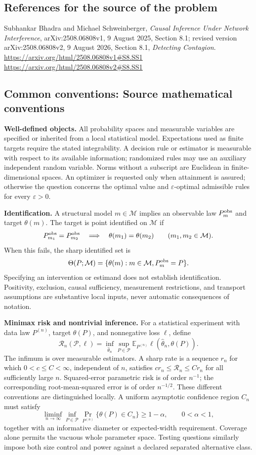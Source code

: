 \documentclass[11pt,a4paper]{article}
\newcommand{\E}{\mathbb E}
\begin{document}
\subsection*{References for the source of the problem}
Subhankar Bhadra and Michael Schweinberger, \emph{Causal Inference Under Network Interference}, arXiv:2508.06808v1, 9 August 2025, Section 8.1; revised version arXiv:2508.06808v2, 9 August 2026, Section 8.1, \emph{Detecting Contagion}.
\url{https://arxiv.org/html/2508.06808v1#S8.SS1}
\url{https://arxiv.org/html/2508.06808v2#S8.SS1}

\subsection*{Common conventions: Source mathematical conventions}

\textbf{Well-defined objects.}
All probability spaces and measurable variables are specified or inherited
from a local statistical model. Expectations used as finite targets require
the stated integrability. A decision rule or estimator is measurable with
respect to its available information; randomized rules may use an auxiliary
independent random variable. Norms without a subscript are Euclidean in
finite-dimensional spaces. An optimizer is requested only when attainment
is assured; otherwise the question concerns the optimal value and
$\varepsilon$-optimal admissible rules for every $\varepsilon>0$.

\textbf{Identification.}
A structural model $m\in\mathcal M$ implies an observable law
$P_m^{\rm obs}$ and target $\theta(m)$. The target is point identified on
$\mathcal M$ if
\[
 P_{m_1}^{\rm obs}=P_{m_2}^{\rm obs}
 \quad\Longrightarrow\quad\theta(m_1)=\theta(m_2)
 \qquad(m_1,m_2\in\mathcal M).
\]
When this fails, the sharp identified set is
\[
 \Theta(P;\mathcal M)=\{\theta(m):m\in\mathcal M,
                                  P_m^{\rm obs}=P\}.
\]
Specifying an intervention or estimand does not establish identification.
Positivity, exclusion, causal sufficiency, measurement restrictions, and
transport assumptions are substantive local inputs, never automatic
consequences of notation.

\textbf{Minimax risk and nontrivial inference.}
For a statistical experiment with data law $P^{(n)}$, target $\theta(P)$,
and nonnegative loss $\ell$, define
\[
 \mathcal R_n(\mathcal P,\ell)
   =\inf_{\widehat\theta_n}\sup_{P\in\mathcal P}
      \E_{P^{(n)}}\ell(\widehat\theta_n,\theta(P)).
\]
The infimum is over measurable estimators. A sharp rate is a sequence
$r_n$ for which $0<c\leq C<\infty$, independent of $n$, satisfies
$c r_n\leq\mathcal R_n\leq C r_n$ for all sufficiently large $n$.
Squared-error parametric risk is of order $n^{-1}$; the corresponding
root-mean-squared error is of order $n^{-1/2}$. These different conventions
are distinguished locally. A uniform asymptotic confidence region $C_n$
must satisfy
\[
 \liminf_{n\to\infty}\inf_{P\in\mathcal P}
     \Pr_{P^{(n)}}\{\theta(P)\in C_n\}\geq 1-\alpha,
 \qquad 0<\alpha<1,
\]
together with an informative diameter or expected-width requirement.
Coverage alone permits the vacuous whole parameter space. Testing questions
similarly impose both size control and power against a declared separated
alternative class.
\end{document}
